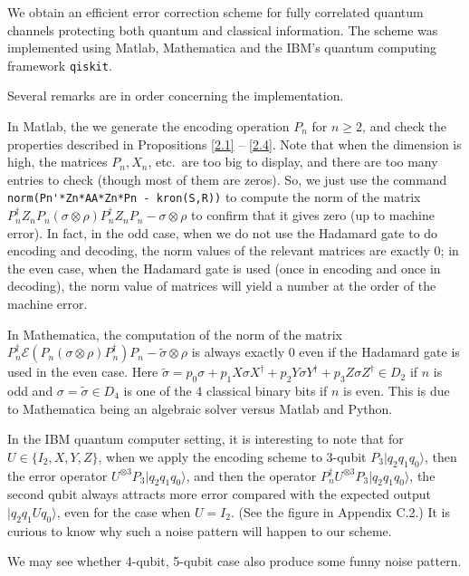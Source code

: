 \documentclass[11pt]{article}
\def\cE{{\mathcal E}}
\def\ra{{\rangle}}
\begin{document}
We obtain an efficient error correction  
scheme for fully correlated quantum channels
protecting both quantum and classical information.
The scheme was implemented using Matlab, Mathematica and
the IBM's quantum computing framework \verb|qiskit|.

\medskip
Several remarks are in order concerning the implementation.

In Matlab, the we generate the encoding operation $P_n$ for $n \ge 2$, and check 
the properties described in Propositions \ref{2.1} -- \ref{2.4}.
Note that when the dimension is high, the matrices $P_n, X_n$, etc.\ are too big to display,
and there are too many entries to check (though most of them are zeros).
So, we just use the command \verb|norm(Pn'*Zn*AA*Zn*Pn - kron(S,R))| to compute the norm
of the matrix $P_n^\dag Z_n P_n(\sigma \otimes \rho)P_n^\dag Z_n P_n - \sigma \otimes \rho$
to confirm that it gives zero (up to machine error). In fact, in the odd case, when 
we do not use the Hadamard gate to do encoding and decoding, the norm values of
the relevant matrices are exactly 0; in the even case, when the Hadamard gate 
is used (once in encoding and once in decoding), the norm value of matrices 
will yield a number at the order of the machine error. 


In Mathematica,
the computation of the norm of the matrix 
$P_n^\dag \cE( P_n (\sigma \otimes \rho) P_n^\dag) P_n  
-\tilde \sigma \otimes \rho$ is always exactly 0 even if the Hadamard
gate is used in the even case.
Here $\tilde \sigma  = p_0 \sigma + p_1 X\sigma X^\dag + p_2 Y \sigma Y^\dag 
+ p_3 Z \sigma Z^\dag \in D_2$ if $n$ is odd and 
$\sigma = \tilde \sigma \in D_4$ is one of the 4 classical binary bits if 
$n$ is even. This is due to Mathematica being an algebraic solver versus Matlab and Python.

In the IBM quantum computer setting, it is interesting to note that 
for $U \in \{I_2, X, Y, Z\}$, 
when we apply the encoding scheme to 3-qubit
$P_3 |q_2q_1q_0\ra$, then the error operator 
$U^{\otimes 3}P_3 |q_2 q_1 q_0\ra$, and then the operator
$P_n^\dag U^{\otimes 3}P_3 |q_2 q_1 q_0\ra$, the second
qubit always attracts more error compared with the expected output $|q_2 q_1 Uq_0\ra$,
even for the case when $U = I_2$. (See the figure in Appendix C.2.)
It is curious to know why such a noise
pattern will happen to our scheme.

We may see whether 4-qubit, 5-qubit case also produce some funny noise pattern.
\end{document}
